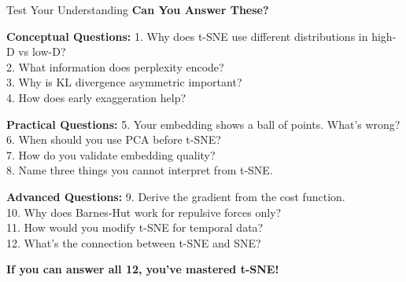\documentclass[10pt]{beamer}
\newcommand{\emphtext}[1]{\textcolor{upcblue}{\textbf{#1}}}
\newcommand{\warningbox}[1]{\colorbox{red!10}{\begin{minipage}{0.85\textwidth}\centering #1\end{minipage}}}
\begin{document}
\begin{frame}{Test Your Understanding}
\emphtext{Can You Answer These?}

\vspace{0.3cm}
\textbf{Conceptual Questions:}
\footnotesize
1. Why does t-SNE use different distributions in high-D vs low-D?\\
2. What information does perplexity encode?\\
3. Why is KL divergence asymmetric important?\\
4. How does early exaggeration help?

\vspace{0.2cm}
\textbf{Practical Questions:}
\footnotesize
5. Your embedding shows a ball of points. What's wrong?\\
6. When should you use PCA before t-SNE?\\
7. How do you validate embedding quality?\\
8. Name three things you cannot interpret from t-SNE.

\vspace{0.2cm}
\textbf{Advanced Questions:}
\footnotesize
9. Derive the gradient from the cost function.\\
10. Why does Barnes-Hut work for repulsive forces only?\\
11. How would you modify t-SNE for temporal data?\\
12. What's the connection between t-SNE and SNE?

\begin{center}
\warningbox{\footnotesize\textbf{If you can answer all 12, you've mastered t-SNE!}}
\end{center}
\end{frame}
\end{document}
